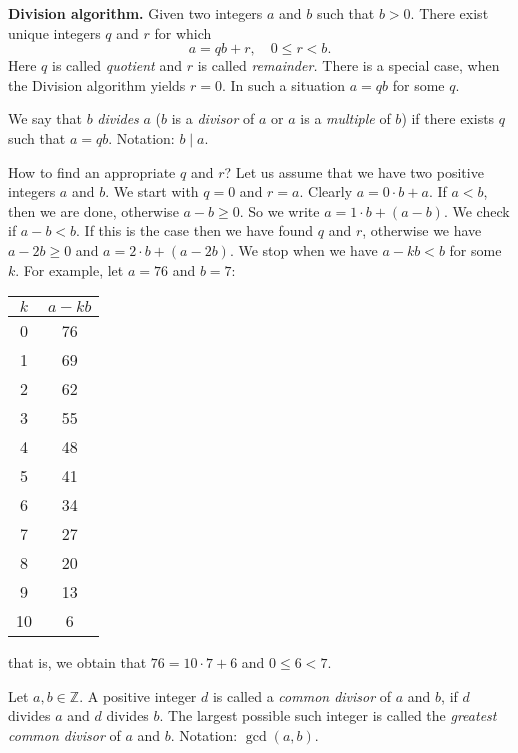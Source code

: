 {\bf Division algorithm.} Given two integers $a$ and $b$ such that $b>0$. There exist unique integers $q$ and $r$ for which 
$$
a=qb+r,\quad 0\leq r<b.
$$
Here $q$ is called \emph{quotient} and $r$ is called \emph{remainder.}
There is a special case, when the Division algorithm yields $r=0$. In such a situation $a=qb$ for some $q$.
\begin{definition}
We say that $b$ \emph{divides} $a$ ($b$ is a \emph{divisor} of $a$ or $a$ is a \emph{multiple} of $b$) if there exists $q$ such that $a=qb$.
Notation: $b\mid a$.
\end{definition}
How to find an appropriate $q$ and $r$? Let us assume that we have two positive integers $a$ and $b$. We start with $q=0$ and $r=a$.
Clearly $a=0\cdot b+a$. If $a<b$, then we are done, otherwise $a-b\geq 0$. So we write $a=1\cdot b+(a-b)$. We check if $a-b<b$. If this is the case
then we have found $q$ and $r$, otherwise we have $a-2b\geq 0$ and $a=2\cdot b+(a-2b)$. We stop when we have $a-kb<b$ for some $k$. For example, let 
$a=76$ and $b=7:$
\begin{center}
\begin{tabular}{|c|c|}
\hline
$k$ & $a-kb$\\
\hline
0 & 76\\
\hline
1 & 69\\
\hline
2 & 62\\
\hline
3 & 55\\
\hline
4 & 48\\
\hline
5 & 41\\
\hline
6 & 34\\
\hline
7 & 27\\
\hline
8 & 20\\
\hline
9 & 13\\
\hline
10 & 6\\
\hline
\end{tabular}
\end{center}
that is, we obtain that $76=10\cdot 7+6$ and $0\leq 6<7$.
\begin{definition}
Let $a,b\in\mathbb{Z}$. A positive integer $d$ is called a \emph{common divisor} of $a$ and $b$, if $d$ divides $a$
and $d$ divides $b$. The largest possible such integer is called the \emph{greatest common divisor} of $a$ and $b$. 
Notation: $\gcd(a,b)$.
\end{definition}

